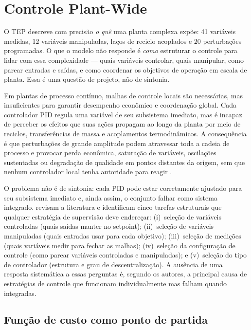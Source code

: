 
\section{Controle Plant-Wide}
\label{sec:plantwide}

O TEP descreve com precisão \textit{o quê} uma planta complexa expõe: 41 variáveis medidas,
12 variáveis manipuladas, laços de reciclo acoplados e 20 perturbações programadas.
O que o modelo não responde é \textit{como} estruturar o controle para lidar com essa
complexidade — quais variáveis controlar, quais manipular, como parear entradas e saídas,
e como coordenar os objetivos de operação em escala de planta.
Essa é uma questão de projeto, não de sintonia.

Em plantas de processo contínuo, malhas de controle locais são necessárias, mas insuficientes
para garantir desempenho econômico e coordenação global.
Cada controlador PID regula uma variável de seu subsistema imediato, mas é incapaz de perceber
os efeitos que suas ações propagam ao longo da planta por meio de reciclos, transferências de
massa e acoplamentos termodinâmicos.
A consequência é que perturbações de grande amplitude podem atravessar toda a cadeia de processo
e provocar perda econômica, saturação de variáveis, oscilações sustentadas ou degradação de
qualidade em pontos distantes da origem, sem que nenhum controlador local tenha autoridade
para reagir \cite{Larsson2000}.

O problema não é de sintonia: cada PID pode estar corretamente ajustado para seu subsistema
imediato e, ainda assim, o conjunto falhar como sistema integrado.
 revisam a literatura e identificam cinco tarefas estruturais que
qualquer estratégia de supervisão deve endereçar:
(i)~seleção de variáveis controladas (quais saídas manter no setpoint);
(ii)~seleção de variáveis manipuladas (quais entradas usar para cada objetivo);
(iii)~seleção de medições (quais variáveis medir para fechar as malhas);
(iv)~seleção da configuração de controle (como parear variáveis controladas e manipuladas); e
(v)~seleção do tipo de controlador (estrutura e grau de descentralização).
A ausência de uma resposta sistemática a essas perguntas é, segundo os autores, a principal
causa de estratégias de controle que funcionam individualmente mas falham quando integradas.

\subsection{Função de custo como ponto de partida}

